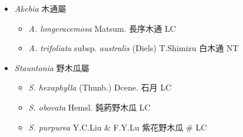
  \begin{itemize}
 \item[] \textit{Akebia} 木通屬
                                
  \begin{itemize}
        \item[] \textit{A. longeracemosa} Matsum.  長序木通   LC
        \item[] \textit{A. trifoliata} subsp. \textit{australis} (Diels) T.Shimizu  白木通   NT
  \end{itemize}
 \item[] \textit{Stauntonia} 野木瓜屬
                                
  \begin{itemize}
        \item[] \textit{S. hexaphylla} (Thunb.) Dcene.  石月   LC
        \item[] \textit{S. obovata} Hemsl.  鈍葯野木瓜   LC
        \item[] \textit{S. purpurea} Y.C.Liu \& F.Y.Lu  紫花野木瓜  \# LC
  \end{itemize}
  \end{itemize}
